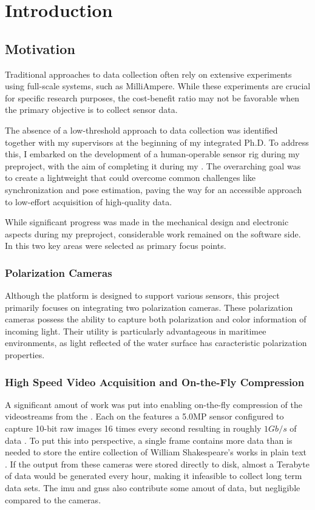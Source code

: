 \chapter{Introduction}

\section{Motivation}
Traditional approaches to data collection often rely on extensive experiments using full-scale systems, such as MilliAmpere.
While these experiments are crucial for specific research purposes, the cost-benefit ratio may not be favorable when the primary objective is to collect sensor data.

The absence of a low-threshold approach to data collection was identified together with my supervisors at the beginning of my integrated Ph.D.
To address this, I embarked on the development of a human-operable sensor rig during my preproject, with the aim of completing it during my \master.
The overarching goal was to create a lightweight \sr that could overcome common challenges like synchronization and pose estimation, paving the way for an accessible approach to low-effort acquisition of high-quality data.


While significant progress was made in the mechanical design and electronic aspects during my preproject, considerable work remained on the software side.
In this \master two key areas were selected as primary focus points.

\subsection{Polarization Cameras}
Although the \sr platform is designed to support various sensors, this \master project primarily focuses on integrating two polarization cameras.
These polarization cameras possess the ability to capture both polarization and color information of incoming light.
Their utility is particularly advantageous in maritimee environments, as light reflected of the water surface has caracteristic polarization properties.


\subsection{High Speed Video Acquisition and On-the-Fly Compression}
\label{sec:intro:compression}
A significant amout of work was put into enabling on-the-fly compression of the videostreams from the \sr.
Each \cam on the \sr features a 5.0MP sensor configured to capture 10-bit raw images 16 times every second resulting in roughly $1Gb/s$ of data \cite{lucidvisionlabsTriton0MPPolarization}.
To put this into perspective, a single frame contains more data than is needed to store the entire collection of William Shakespeare's works in plain text \cite{projectgutenbergCompleteWorksWilliam1994}.
If the output from these cameras were stored directly to disk, almost a Terabyte of data would be generated every hour, making it infeasible to collect long term data sets.
The \gls{imu} and \gls{gnss} also contribute some amout of data, but negligible compared to the cameras.

